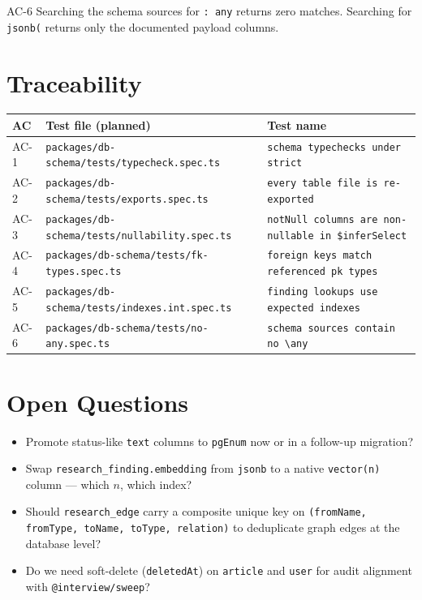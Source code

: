 \begin{ac}{AC-6}
Searching the schema sources for \texttt{: any} returns zero matches.
Searching for \texttt{jsonb(} returns only the documented payload columns.
\end{ac}

\section{Traceability}

\begin{center}
\small
\begin{tabular}{@{}lll@{}}
\toprule
AC & Test file (planned) & Test name \\
\midrule
AC-1 & \texttt{packages/db-schema/tests/typecheck.spec.ts}       & \texttt{schema typechecks under strict} \\
AC-2 & \texttt{packages/db-schema/tests/exports.spec.ts}         & \texttt{every table file is re-exported} \\
AC-3 & \texttt{packages/db-schema/tests/nullability.spec.ts}     & \texttt{notNull columns are non-nullable in \$inferSelect} \\
AC-4 & \texttt{packages/db-schema/tests/fk-types.spec.ts}        & \texttt{foreign keys match referenced pk types} \\
AC-5 & \texttt{packages/db-schema/tests/indexes.int.spec.ts}     & \texttt{finding lookups use expected indexes} \\
AC-6 & \texttt{packages/db-schema/tests/no-any.spec.ts}          & \texttt{schema sources contain no \textbackslash any} \\
\bottomrule
\end{tabular}
\end{center}

\section{Open Questions}
\begin{itemize}[leftmargin=1.2em]
  \item Promote status-like \texttt{text} columns to \texttt{pgEnum} now or in a
        follow-up migration?
  \item Swap \texttt{research\_finding.embedding} from \texttt{jsonb} to a
        native \texttt{vector(n)} column --- which \(n\), which index?
  \item Should \texttt{research\_edge} carry a composite unique key on
        \texttt{(fromName, fromType, toName, toType, relation)} to deduplicate
        graph edges at the database level?
  \item Do we need soft-delete (\texttt{deletedAt}) on \texttt{article} and
        \texttt{user} for audit alignment with \texttt{@interview/sweep}?
\end{itemize}


